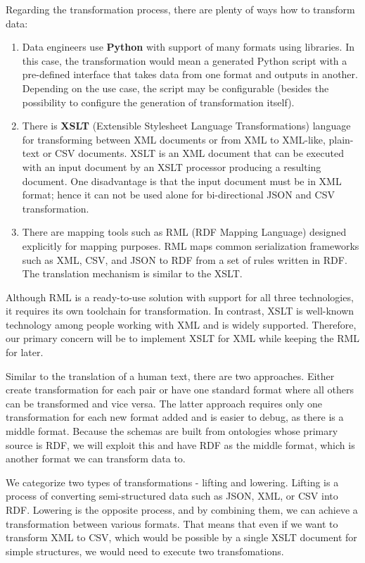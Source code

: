 Regarding the transformation process, there are plenty of ways how to transform data:
\begin{enumerate}
    \item Data engineers use \textbf{Python} with support of many formats using libraries. In this case, the transformation would mean a generated Python script with a pre-defined interface that takes data from one format and outputs in another. Depending on the use case, the script may be configurable (besides the possibility to configure the generation of transformation itself).
    \item There is \textbf{XSLT} (Extensible Stylesheet Language Transformations) language for transforming between XML documents or from XML to XML-like, plain-text or CSV documents. XSLT is an XML document that can be executed with an input document by an XSLT processor producing a resulting document. One disadvantage is that the input document must be in XML format; hence it can not be used alone for bi-directional JSON and CSV transformation.
    \item There are mapping tools such as RML \cite{dimou2014rml} (RDF Mapping Language) designed explicitly for mapping purposes. RML maps common serialization frameworks such as XML, CSV, and JSON to RDF from a set of rules written in RDF. The translation mechanism is similar to the XSLT.
\end{enumerate}

Although RML is a ready-to-use solution with support for all three technologies, it requires its own toolchain for transformation. In contrast, XSLT is well-known technology among people working with XML and is widely supported. Therefore, our primary concern will be to implement XSLT for XML while keeping the RML for later.

Similar to the translation of a human text, there are two approaches. Either create transformation for each pair or have one standard format where all others can be transformed and vice versa. The latter approach requires only one transformation for each new format added and is easier to debug, as there is a middle format. Because the schemas are built from ontologies whose primary source is RDF, we will exploit this and have RDF as the middle format, which is another format we can transform data to.

\medskip

We categorize two types of transformations - lifting and lowering. Lifting is a process of converting semi-structured data such as JSON, XML, or CSV into RDF. Lowering is the opposite process, and by combining them, we can achieve a transformation between various formats. That means that even if we want to transform XML to CSV, which would be possible by a single XSLT document for simple structures, we would need to execute two transfomations.

